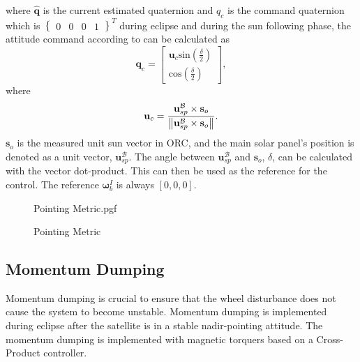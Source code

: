 where $\hat{\mathbf{q}}$ is the current estimated quaternion and $q_{c}$ is the command quaternion which is $\begin{Bmatrix}
	0 & 0 & 0& 1
\end{Bmatrix}^T$ during eclipse and during the sun following phase, the attitude command according to \cite{chen2000ground} can be calculated as 
\begin{equation}
	\mathbf{q}_c = \begin{bmatrix}
		\mathbf{u}_c \text{sin}(\frac{\delta}{2}) \\
		\text{cos}(\frac{\delta}{2})
	\end{bmatrix},
\end{equation}
where 
\begin{equation}
	\mathbf{u}_c = \frac{\mathbf{u}_{sp}^{\mathcal{B}} \times \mathbf{s}_o}{\left\lVert\mathbf{u}_{sp}^{\mathcal{B}} \times \mathbf{s}_o\right\rVert}.
\end{equation}
$\mathbf{s}_o$ is the measured unit sun vector in ORC, and the main solar panel's position is denoted as a unit vector, $\mathbf{u}_{sp}^{\mathcal{B}}$. The angle between $\mathbf{u}_{sp}^{\mathcal{B}}$ and $\mathbf{s}_o$, $\delta$, can be calculated with the vector dot-product. This can then be used as the reference for the control. The reference $\boldsymbol{\omega}_b^I$ is always $[0, 0, 0]$. 

\begin{figure}[!htb]
	\centering
	\def\pgfwidth{10cm}
	{Pointing Metric.pgf}
	
	\caption{Pointing Metric}
	\label{fig:Pointing Metric}
\end{figure}

\subsection{Momentum Dumping}
Momentum dumping is crucial to ensure that the wheel disturbance does not cause the system to become unstable. Momentum dumping is implemented during eclipse after the satellite is in a stable nadir-pointing attitude. The momentum dumping is implemented with magnetic torquers based on a Cross-Product controller. 

